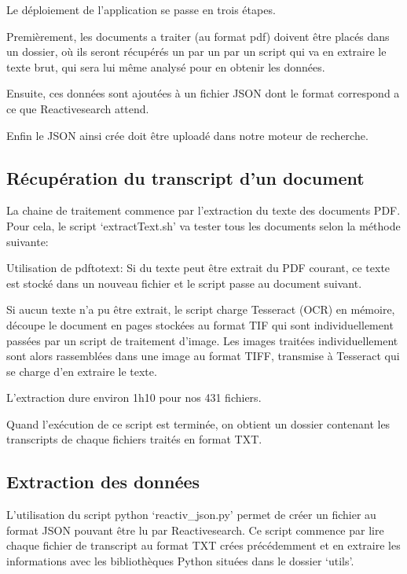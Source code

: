 

Le déploiement de l'application se passe en trois étapes.

Premièrement, les documents a traiter (au format pdf) doivent être placés dans un dossier, où ils seront récupérés un par un par un script qui va en extraire le texte brut, qui sera lui même analysé pour en obtenir les données.

Ensuite, ces données sont ajoutées à un fichier JSON dont le format correspond a ce que Reactivesearch attend.

Enfin le JSON ainsi crée doit être uploadé dans notre moteur de recherche.

\subsection{Récupération du transcript d'un document}
La chaine de traitement commence par l'extraction du texte des documents PDF.
Pour cela, le script `extractText.sh' va tester tous les documents selon la méthode suivante:

Utilisation de pdftotext: Si du texte peut être extrait du PDF courant, ce texte est stocké dans un nouveau fichier et le script passe au document suivant.

Si aucun texte n'a pu être extrait, le script charge Tesseract (\gls{OCR}) en mémoire, découpe le document en pages stockées au format TIF qui sont individuellement passées par un script de traitement d'image.
Les images traitées individuellement sont alors rassemblées dans une image au format TIFF, transmise à Tesseract qui se charge d'en extraire le texte.

L'extraction dure environ 1h10 pour nos 431 fichiers.

Quand l'exécution de ce script est terminée, on obtient un dossier contenant les transcripts de chaque fichiers traités en format TXT\@.

\subsection{Extraction des données}
L'utilisation du script python `reactiv\_json.py' permet de créer un fichier au format JSON pouvant être lu par Reactivesearch.
Ce script commence par lire chaque fichier de transcript au format TXT crées précédemment et en extraire les informations avec les bibliothèques Python situées dans le dossier `utils'.

